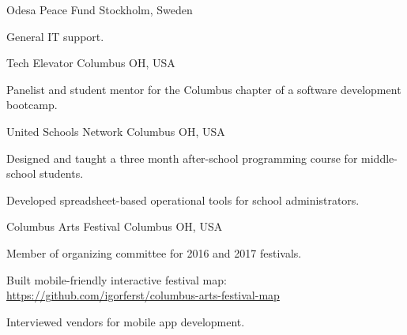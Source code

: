 

\begin{cventries}

  \cventryshort
    {Odesa Peace Fund} %
    {Stockholm, Sweden} %
    {
      \begin{cvitems} %
        \item {General IT support.}
      \end{cvitems}
    }

  \cventryshort
    {Tech Elevator} %
    {Columbus OH, USA} %
    {
      \begin{cvitems} %
        \item {Panelist and student mentor for the Columbus chapter of a software development bootcamp.}
      \end{cvitems}
    }

  \cventryshort
    {United Schools Network} %
    {Columbus OH, USA} %
    {
      \begin{cvitems} %
        \item {Designed and taught a three month after-school programming course for middle-school students.}
        \item {Developed spreadsheet-based operational tools for school administrators.}
      \end{cvitems}
    }

  \cventryshort
    {Columbus Arts Festival} %
    {Columbus OH, USA} %
    {
      \begin{cvitems} %
        \item {Member of organizing committee for 2016 and 2017 festivals.}
        \item {Built mobile-friendly interactive festival map: \url{https://github.com/igorferst/columbus-arts-festival-map}}
        \item {Interviewed vendors for mobile app development.}
      \end{cvitems}
    }

\end{cventries}
